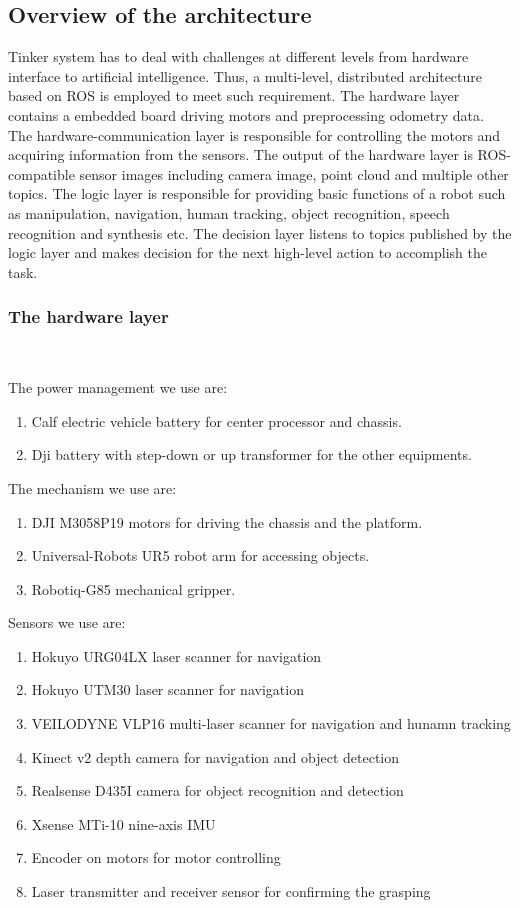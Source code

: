 \subsection{Overview of the architecture}
Tinker system has to deal with challenges at different levels from hardware interface to artificial intelligence. Thus, a multi-level, distributed architecture based on ROS is employed to meet such requirement. The hardware layer contains a embedded board driving motors and preprocessing odometry data. The hardware-communication layer is responsible for controlling the motors and acquiring information from the sensors. The output of the hardware layer is ROS-compatible sensor images including camera image, point cloud and multiple other topics. The logic layer is responsible for providing basic functions of a robot such as manipulation, navigation, human tracking, object recognition, speech recognition and synthesis etc. The decision layer listens to topics published by the logic layer and makes decision for the next high-level action to accomplish the task.

\subsubsection{The hardware layer}
\ 

The power management we use are:
\begin{enumerate}
	\item Calf electric vehicle battery for center processor and chassis.
	\item Dji battery with step-down or up transformer for the other equipments.
\end{enumerate}

The mechanism we use are:
\begin{enumerate}
    \item DJI M3058P19 motors for driving the chassis and the platform.
    \item Universal-Robots UR5 robot arm for accessing objects.
    \item Robotiq-G85 mechanical gripper.
\end{enumerate}

Sensors we use are:
\begin{enumerate}
    \item Hokuyo URG04LX laser scanner for navigation
    \item Hokuyo UTM30 laser scanner for navigation
    \item VEILODYNE VLP16 multi-laser scanner for navigation and hunamn tracking
    \item Kinect v2 depth camera for navigation and object detection
    \item Realsense D435I camera for object recognition and detection
    \item Xsense MTi-10 nine-axis IMU
    \item Encoder on motors for motor controlling
    \item Laser transmitter and receiver sensor for confirming the grasping
\end{enumerate}

